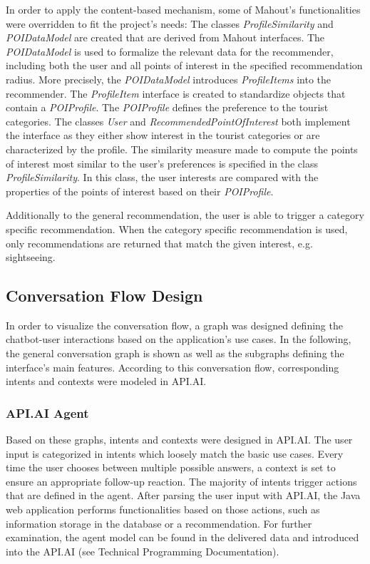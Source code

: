 In order to apply the content-based mechanism, some of Mahout’s functionalities were overridden to fit the project’s needs: The classes \textit{ProfileSimilarity} and \textit{POIDataModel} are created that are derived from Mahout interfaces. The \textit{POIDataModel} is used to formalize the relevant data for the recommender, including both the user and all points of interest in the specified recommendation radius. More precisely, the \textit{POIDataModel} introduces \textit{ProfileItems} into the recommender. The \textit{ProfileItem} interface is created to standardize objects that contain a \textit{POIProfile}. The \textit{POIProfile} defines the preference to the tourist categories. The classes \textit{User} and \textit{RecommendedPointOfInterest} both implement the interface as they either show interest in the tourist categories or are characterized by the profile. 
The similarity measure made to compute the points of interest most similar to the user’s preferences is specified in the class \textit{ProfileSimilarity}. In this class, the user interests are compared with the properties of the points of interest based on their \textit{POIProfile}.
 
Additionally to the general recommendation, the user is able to trigger a category specific recommendation. When the category specific recommendation is used, only recommendations are returned that match the given interest, e.g. sightseeing.


\subsection{Conversation Flow Design}
In order to visualize the conversation flow, a graph was designed defining the chatbot-user interactions based on the application’s use cases. In the following, the general conversation graph is shown as well as the subgraphs defining the interface’s main features. According to this conversation flow, corresponding intents and contexts were modeled in API.AI.






\subsubsection{API.AI Agent}
Based on these graphs, intents and contexts were designed in API.AI. The user input is categorized in intents which loosely match the basic use cases. Every time the user chooses between multiple possible answers, a context is set to ensure an appropriate follow-up reaction. The majority of intents trigger actions that are defined in the agent. After parsing the user input with API.AI, the Java web application performs functionalities based on those actions, such as information storage in the database or a recommendation. For further examination, the agent model can be found in the delivered data and introduced into the API.AI (see Technical Programming Documentation).